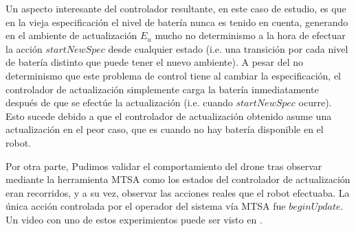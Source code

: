Un aspecto interesante del controlador resultante, en este caso de estudio, es que en la vieja especificación el nivel
de batería nunca es tenido en cuenta, generando en el ambiente de actualización $E_u$ mucho no determinismo a la hora de
efectuar la acción $startNewSpec$ desde cualquier estado (i.e. una transición por cada nivel de batería distinto que
puede tener el nuevo ambiente). A pesar del no determinismo que este problema de control tiene al cambiar la
especificación, el controlador de actualización simplemente carga la batería inmediatamente después de que se efectúe la
actualización (i.e. cuando $startNewSpec$ ocurre). Esto sucede debido a que el controlador de actualización obtenido
asume una actualización en el peor caso, que es cuando no hay batería disponible en el robot.

Por otra parte, Pudimos validar el comportamiento del drone tras observar mediante la herramienta MTSA como los estados
del controlador de actualización eran recorridos, y a su vez, observar las acciones reales que el robot efectuaba. La
única acción controlada por el operador del sistema vía MTSA fue $beginUpdate$. Un video con uno de estos experimientos
puede ser visto en \cite{}.


